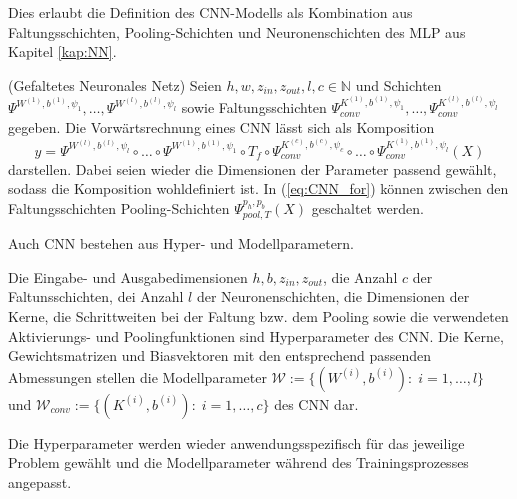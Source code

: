 Dies erlaubt die Definition des CNN-Modells als Kombination aus Faltungsschichten, Pooling-Schichten und Neuronenschichten des MLP aus Kapitel \ref{kap:NN}. 
\begin{defi}(Gefaltetes Neuronales Netz)
    Seien $h, w, z_{in}, z_{out}, l ,c \in \mathbb{N}$ und Schichten $\Psi^{W^{(1)},b^{(1)},\psi_{1}}, \ldots, \Psi^{W^{(l)},b^{(l)},\psi_{l}}$ sowie Faltungsschichten $\Psi_{conv}^{K^{(1)},b^{(1)},\psi_{1}}, \ldots, \Psi_{conv}^{K^{(l)},b^{(l)},\psi_{l}}$ gegeben. Die Vorwärtsrechnung eines CNN lässt sich als Komposition
    \begin{equation}
        \label{eq:CNN_for}
        y=\Psi^{W^{(l)},b^{(l)},\psi_{l}} \circ \ldots \circ \Psi^{W^{(1)},b^{(1)},\psi_{1}} \circ T_f \circ \Psi_{conv}^{K^{(c)},b^{(c)},\psi_{c}} \circ \ldots \circ \Psi_{conv}^{K^{(1)},b^{(1)},\psi_{l}}(X)
    \end{equation} 
    darstellen. Dabei seien wieder die Dimensionen der Parameter passend gewählt, sodass die Komposition wohldefiniert ist. In (\ref{eq:CNN_for}) können zwischen den Faltungsschichten Pooling-Schichten $\Psi_{pool,T}^{p_h,p_b}(X)$ geschaltet werden.
\end{defi}
Auch CNN bestehen aus Hyper- und Modellparametern.

\begin{defi}
    Die Eingabe- und Ausgabedimensionen $h, b, z_{in}, z_{out}$, die Anzahl $c$ der Faltunsschichten, dei Anzahl $l$ der Neuronenschichten, die Dimensionen der Kerne, die Schrittweiten bei der Faltung bzw. dem Pooling sowie die verwendeten Aktivierungs- und Poolingfunktionen sind Hyperparameter des CNN.
    Die Kerne, Gewichtsmatrizen und Biasvektoren mit den entsprechend passenden Abmessungen stellen die Modellparameter $\mathcal{W}:=\{(W^{(i)},b^{(i)}): \; i=1, \ldots, l\}$ und $\mathcal{W}_{conv}:=\{(K^{(i)}, b^{(i)}): \; i=1, \ldots, c\}$ des CNN dar. 
\end{defi}
Die Hyperparameter werden wieder anwendungsspezifisch für das jeweilige Problem gewählt und die Modellparameter während des Trainingsprozesses angepasst. 


